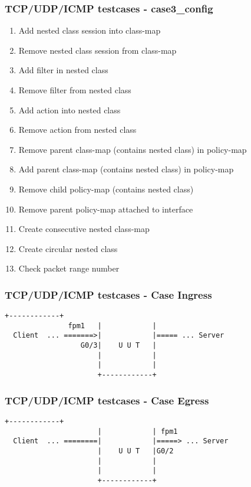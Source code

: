 \documentclass{beamer}
\begin{document}
\begin{frame}[fragile] \frametitle{TCP/UDP/ICMP testcases - case3\_config}
\begin{enumerate}
    \item Add nested class session into class-map
    \item Remove nested class session from class-map
    \item Add filter in nested class
    \item Remove filter from nested class
    \item Add action into nested class
    \item Remove action from nested class
    \item Remove parent class-map (contains nested class) in policy-map
    \item Add parent class-map (contains nested class) in policy-map
    \item Remove child policy-map (contains nested class)
    \item Remove parent policy-map attached to interface
    \item Create consecutive nested class-map
    \item Create circular nested class
    \item Check packet range number
\end{enumerate}
\end{frame}
\begin{frame}[fragile] \frametitle{TCP/UDP/ICMP testcases - Case Ingress}
\begin{lstlisting}[language=Terminall]
                      +------------+
               fpm1   |            |
  Client  ... =======>|            |===== ... Server
                  G0/3|    U U T   |
                      |            |
                      |            |
                      +------------+
\end{lstlisting}
\end{frame}
	
\begin{frame}[fragile] \frametitle{TCP/UDP/ICMP testcases - Case Egress}
\begin{lstlisting}[language=Terminall]
                      +------------+
                      |            | fpm1
  Client  ... ========|            |=====> ... Server
                      |    U U T   |G0/2
                      |            |
                      |            |
                      +------------+
\end{lstlisting}
\end{frame}
\end{document}
